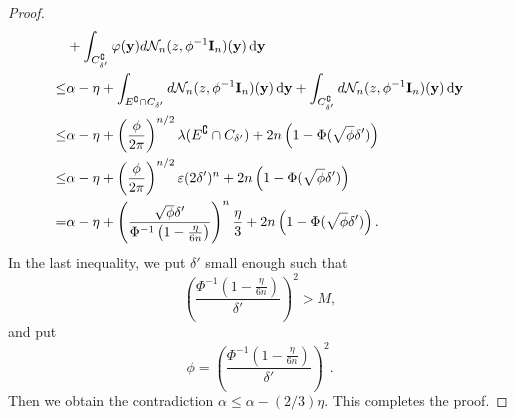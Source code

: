 \documentclass[11pt]{article}
\newcommand{\By}{\mathbf{y}}    \newcommand{\Bz}{\mathbf{z}}
\theoremstyle{plain}
\theoremstyle{definition}
\theoremstyle{remark}
\begin{document}
\begin{proof}
\begin{equation*}
\begin{split}
            &+
            \int_{C_{\delta'}^\complement}\varphi(\By) d\mathcal N_n (z, \phi^{-1} \BI_n) (\By)\,\mathrm{d} \By
            \\
            \leq&
            \alpha-\eta
            +
            \int_{E^\complement\cap C_{\delta'}} d\mathcal N_n (z, \phi^{-1} \BI_n) (\By)\,\mathrm{d} \By
            +
            \int_{C_{\delta'}^\complement} d\mathcal N_n (z, \phi^{-1} \BI_n) (\By)\,\mathrm{d} \By
            \\
            \leq&
            \alpha-\eta
            +
            \left(\frac{\phi}{2\pi}\right)^{n/2}\lambda(E^\complement\cap C_{\delta'})
            +
            2n\left(1-\Phi(\sqrt \phi \delta')\right)
            \\
            \leq&
            \alpha-\eta
            +
            \left(\frac{\phi}{2\pi}\right)^{n/2}
            \varepsilon
            (2\delta')^n
            +
            2n\left(1-\Phi(\sqrt \phi \delta')\right)
            \\
            =&
            \alpha-\eta
            +
            \left(\frac{\sqrt{\phi} \delta'}{\Phi^{-1}\left(1-\frac{\eta}{6n}\right)}\right)^{n}
            \frac{\eta}{3}
            +
            2n\left(1-\Phi(\sqrt \phi \delta')\right).
        \end{split}
    \end{equation*}
    In the last inequality, we put $\delta'$ small enough such that
\begin{equation*}
    \left(\frac{\Phi^{-1}\left(1-\frac{\eta}{6n}\right)}{\delta'}\right)^2>M,
\end{equation*}
and put
    \begin{equation*}
        \phi = \left(\frac{\Phi^{-1}\left(1-\frac{\eta}{6n}\right)}{\delta'}\right)^2.
    \end{equation*}
    Then we obtain the contradiction $\alpha\leq \alpha-(2/3)\eta$.
    This completes the proof.

    
\end{proof}
\end{document}
